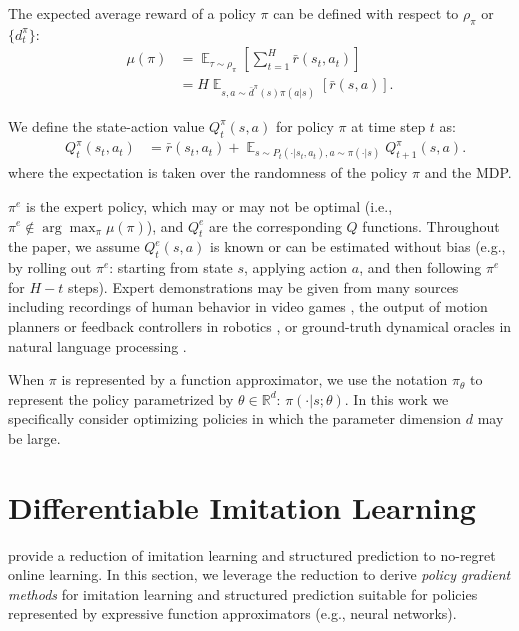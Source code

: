 \documentclass{article}
\begin{document}
The expected average reward of a policy $\pi$ can be defined with respect to $\rho_{\pi}$ or $\{d_t^{\pi}\}$:
\begin{align}
\mu(\pi) &= \mathop{\mathbb{E}}_{\tau\sim \rho_{\pi}}[\sum_{t=1}^H \bar{r}(s_t,a_t)] \nonumber \\
&= H\mathop{\mathbb{E}}_{s,a\sim \bar{d}^{\pi}(s)\pi(a|s)}[\bar{r}(s,a)].\nonumber
\end{align}


We define the state-action value $Q_t^{\pi}(s,a)$ for policy $\pi$ at time step $t$ as:
\begin{align}
&Q_t^{\pi}(s_t,a_t) %
&=\bar{r}(s_t,a_t) + \mathop{\mathbb{E}}_{s\sim P_t(\cdot|s_t,a_t),a\sim\pi(\cdot|s)}Q^\pi_{t+1}(s,a). \nonumber
\end{align} where the expectation is taken over the randomness of the policy $\pi$ and the MDP. 

$\pi^{e}$ is the expert policy, which may or may not be optimal (i.e., $\pi^e \not\in \arg\max_{\pi} \mu(\pi)$), and $Q_t^{e}$ are the corresponding $Q$ functions. Throughout the paper, we assume $Q_t^{e}(s,a)$ is known or can be estimated without bias (e.g., by rolling out $\pi^e$: starting from state $s$, applying action $a$, and then following $\pi^e$ for $H-t$ steps). Expert demonstrations may be given from many sources including recordings of human behavior in video games \cite{Ross2011_AISTATS}, the output of motion planners or feedback controllers in robotics \cite{kahn2016plato}, or ground-truth  dynamical oracles in natural language processing \cite{chang2015learning_dependency,chang2015learning}.

When $\pi$ is represented by a function approximator, we use the notation $\pi_{\theta}$ to represent the policy parametrized by $\theta\in \mathbb{R}^{d}$: $\pi(\cdot|s;\theta)$. In this work we specifically consider optimizing policies in which the parameter dimension $d$ may be large. 




\section{Differentiable Imitation Learning}
\label{sec:alg}
\citet{ross2014reinforcement} provide a reduction of imitation learning and structured prediction to no-regret online learning. In this section, we leverage the reduction to derive \emph{policy gradient methods} for imitation learning and structured prediction suitable for policies represented by expressive function approximators (e.g., neural networks).
\end{document}
